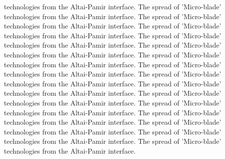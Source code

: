 technologies from the Altai-Pamir interface. The spread of 'Micro-blade' technologies from the Altai-Pamir interface. The spread of 'Micro-blade' technologies from the Altai-Pamir interface. The spread of 'Micro-blade' technologies from the Altai-Pamir interface. The spread of 'Micro-blade' technologies from the Altai-Pamir interface. The spread of 'Micro-blade' technologies from the Altai-Pamir interface. The spread of 'Micro-blade' technologies from the Altai-Pamir interface. The spread of 'Micro-blade' technologies from the Altai-Pamir interface. The spread of 'Micro-blade' technologies from the Altai-Pamir interface. The spread of 'Micro-blade' technologies from the Altai-Pamir interface. The spread of 'Micro-blade' technologies from the Altai-Pamir interface. The spread of 'Micro-blade' technologies from the Altai-Pamir interface. The spread of 'Micro-blade' technologies from the Altai-Pamir interface. The spread of 'Micro-blade' technologies from the Altai-Pamir interface. The spread of 'Micro-blade' technologies from the Altai-Pamir interface. The spread of 'Micro-blade' technologies from the Altai-Pamir interface. 

